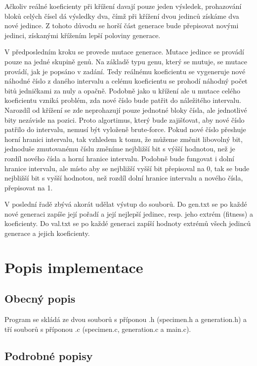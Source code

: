 \documentclass[11pt, a4paper]{article}
\begin{document}
Ačkoliv reálné koeficienty při křížení davají pouze jeden výsledek, prohazování bloků celých čísel dá výsledky dva, čímž při křížení dvou jedinců získáme dva nové jedince. Z tohoto důvodu se horší část generace bude přepisovat novými jedinci, získanými křížením lepší poloviny generace.\par
V předposledním kroku se provede mutace generace. Mutace jedince se provádí pouze na jedné skupině genů. Na základě typu genu, který se mutuje, se mutace provádí, jak je popsáno v zadání. Tedy reálnému koeficientu se vygeneruje nové náhodné číslo z daného intervalu a celému koeficientu se prohodí náhodný počet bitů jedničkami za nuly a opačně. Podobně jako u křížení ale u mutace celého koeficientu vzniká problém, zda nové číslo bude patřit do náležitého intervalu. Narozdíl od křížení se zde neprohazují pouze jednotné bloky čísla, ale jednotlivé bity nezávisle na pozici. Proto algortimus, který bude zajišťovat, aby nové číslo patřilo do intervalu, nemusí být vyloženě brute-force. Pokud nové číslo přeshuje horní hranici intervalu, tak vzhledem k tomu, že můžeme změnit libovolný bit, jednoduše zmutovanému číslu změníme nejbližší bit s výšší hodnotou, než je rozdíl nového čísla a horní hranice intervalu. Podobně bude fungovat i dolní hranice intervalu, ale místo aby se nejbližší vyšší bit přepisoval na 0, tak se bude nejbližší bit s vyšší hodnotou, než rozdíl dolní hranice intervalu a nového čísla, přepisovat na 1.\par
V poslední řadě zbývá akorát udělat výstup do souborů. Do gen.txt se po každé nové generaci zapíše její pořadí a její nejlepší jedinec, resp. jeho extrém (fitness) a  koeficienty. Do val.txt se po každé generaci zapíší hodnoty extrémů všech jedinců generace a jejich koeficienty.
\newpage
%
%
\section{Popis implementace}
\subsection{Obecný popis}
Program se skládá ze dvou souborů s příponou .h (specimen.h a generation.h) a tří souborů s příponou .c (specimen.c, generation.c a main.c).\par
\subsection{Podrobné popisy}
\end{document}
